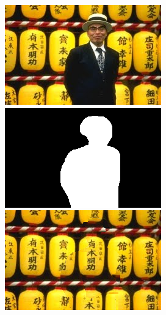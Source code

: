\documentclass[a4paper, 10pt]{article}
\begin{document}
\begin{figure}[H]
\begin{minipage}{.4\textwidth}
\centering
\includegraphics[scale=0.45]{images/asiatic.jpg}
\end{minipage}%
\begin{minipage}{.4\textwidth}
\centering
\includegraphics[scale=0.45]{images/asiatic_mask.png}
\end{minipage}%
\begin{minipage}{.4\textwidth}
\centering
\includegraphics[scale=0.53]{inpainted/bench_asiatique29.png}
\end{minipage}%
\end{figure}
\end{document}
